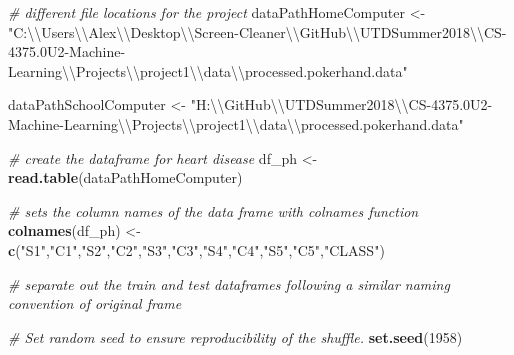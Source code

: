 \documentclass[]{article}
\newenvironment{Shaded}{\begin{snugshade}}{\end{snugshade}}
\newcommand{\KeywordTok}[1]{\textcolor[rgb]{0.13,0.29,0.53}{\textbf{#1}}}
\newcommand{\DecValTok}[1]{\textcolor[rgb]{0.00,0.00,0.81}{#1}}
\newcommand{\CharTok}[1]{\textcolor[rgb]{0.31,0.60,0.02}{#1}}
\newcommand{\StringTok}[1]{\textcolor[rgb]{0.31,0.60,0.02}{#1}}
\newcommand{\CommentTok}[1]{\textcolor[rgb]{0.56,0.35,0.01}{\textit{#1}}}
\newcommand{\NormalTok}[1]{#1}
\begin{document}
\begin{Shaded}
\begin{Highlighting}[]
\CommentTok{# different file locations for the project}
\NormalTok{dataPathHomeComputer <-}\StringTok{ "C:}\CharTok{\textbackslash{}\textbackslash{}}\StringTok{Users}\CharTok{\textbackslash{}\textbackslash{}}\StringTok{Alex}\CharTok{\textbackslash{}\textbackslash{}}\StringTok{Desktop}\CharTok{\textbackslash{}\textbackslash{}}\StringTok{Screen-Cleaner}\CharTok{\textbackslash{}\textbackslash{}}\StringTok{GitHub}\CharTok{\textbackslash{}\textbackslash{}}\StringTok{UTDSummer2018}\CharTok{\textbackslash{}\textbackslash{}}\StringTok{CS-4375.0U2-Machine-Learning}\CharTok{\textbackslash{}\textbackslash{}}\StringTok{Projects}\CharTok{\textbackslash{}\textbackslash{}}\StringTok{project1}\CharTok{\textbackslash{}\textbackslash{}}\StringTok{data}\CharTok{\textbackslash{}\textbackslash{}}\StringTok{processed.pokerhand.data"}

\NormalTok{dataPathSchoolComputer <-}\StringTok{ "H:}\CharTok{\textbackslash{}\textbackslash{}}\StringTok{GitHub}\CharTok{\textbackslash{}\textbackslash{}}\StringTok{UTDSummer2018}\CharTok{\textbackslash{}\textbackslash{}}\StringTok{CS-4375.0U2-Machine-Learning}\CharTok{\textbackslash{}\textbackslash{}}\StringTok{Projects}\CharTok{\textbackslash{}\textbackslash{}}\StringTok{project1}\CharTok{\textbackslash{}\textbackslash{}}\StringTok{data}\CharTok{\textbackslash{}\textbackslash{}}\StringTok{processed.pokerhand.data"}

\CommentTok{# create the dataframe for heart disease}
\NormalTok{df_ph <-}\StringTok{ }\KeywordTok{read.table}\NormalTok{(dataPathHomeComputer)}

\CommentTok{# sets the column names of the data frame with colnames function}
\KeywordTok{colnames}\NormalTok{(df_ph) <-}\StringTok{ }\KeywordTok{c}\NormalTok{(}\StringTok{"S1"}\NormalTok{,}\StringTok{"C1"}\NormalTok{,}\StringTok{"S2"}\NormalTok{,}\StringTok{"C2"}\NormalTok{,}\StringTok{"S3"}\NormalTok{,}\StringTok{"C3"}\NormalTok{,}\StringTok{"S4"}\NormalTok{,}\StringTok{"C4"}\NormalTok{,}\StringTok{"S5"}\NormalTok{,}\StringTok{"C5"}\NormalTok{,}\StringTok{"CLASS"}\NormalTok{)}



\CommentTok{# separate out the train and test dataframes following a similar naming convention of original frame}

\CommentTok{# Set random seed to ensure reproducibility of the shuffle.}
\KeywordTok{set.seed}\NormalTok{(}\DecValTok{1958}\NormalTok{)}



\end{Highlighting}
\end{Shaded}
\end{document}
